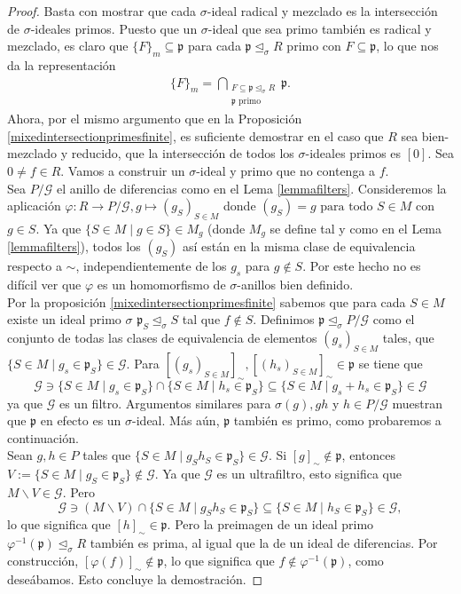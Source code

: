 \documentclass[letterpaper]{article}
\def\fa{\text{ para todo }}
\def\p{\mathfrak{p}}
\def\s{\sigma}
\def\si{\unlhd_{\sigma}}
\theoremstyle{definition}
\begin{document}
\begin{proof}
Basta con mostrar que cada $\sigma$-ideal radical y mezclado es la intersecci\'on de $\sigma$-ideales primos. Puesto que un $\sigma$-ideal que sea primo tambi\'en es radical y mezclado,
es claro que $\{F\}_m \subseteq \p$ para cada $\p \si R$ primo con $F \subseteq \p$, lo que nos da la representaci\'on
\begin{align*} \{F\}_m = \bigcap_{\substack{F \subseteq \p \si R \\ \p \text{ primo}}} \p. \end{align*}
Ahora, por el mismo argumento que en la Proposici\'on \ref{mixedintersectionprimesfinite}, es suficiente demostrar en el caso que $R$ sea bien-mezclado y reducido, que la intersecci\'on de todos los $\sigma$-ideales primos es $[0]$.
Sea $0 \neq f \in R$. Vamos a construir un $\sigma$-ideal y primo que no contenga a $f$.\\

Sea $P/\mathcal{G}$ el anillo de diferencias como en el Lema \ref{lemmafilters}. Consideremos la aplicaci\'on $\varphi: R \rightarrow P/\mathcal{G}, g \mapsto (g_S)_{S \in M}$ donde $(g_S) = g \fa S \in M$ con $g \in S$. 
Ya que $\{ S \in M \mid g \in S \} \in M_g$ (donde $M_g$ se define tal y como en el Lema \ref{lemmafilters}), todos los $(g_S)$ as\'i est\'an en la misma clase de equivalencia respecto a $\sim$, independientemente de los $g_s$ para $g \notin S$. 
Por este hecho no es dif\'icil ver que $\varphi$ es un homomorfismo de $\sigma$-anillos bien definido. \\

Por la proposici\'on \ref{mixedintersectionprimesfinite} sabemos que para cada $S \in M$ existe un ideal primo $\s$ $\p_S \si S$ tal que $f \notin S$. 
Definimos $\p \si P/\mathcal{G}$ como el conjunto de todas las clases de equivalencia de elementos $(g_s)_{S \in M}$ tales, que $\{ S \in M \mid g_s \in \p_S \} \in \mathcal{G}$. 
Para $[(g_s)_{S \in M}]_{\sim}, [(h_s)_{S \in M}]_{\sim} \in \p$ se tiene que $$ \mathcal{G} \ni \{ S \in M \mid  g_s \in \p_S \} \cap  \{ S \in M \mid  h_s \in \p_S \} \subseteq \{ S \in M \mid  g_s + h_s \in \p_S \} \in \mathcal{G}$$
ya que $\mathcal{G}$ es un filtro. Argumentos similares para $\s(g), gh$ y $h \in P/\mathcal{G}$ muestran que $\p$ en efecto es un $\sigma$-ideal. M\'as a\'un, $\p$ tambi\'en es primo, como probaremos a continuaci\'on.\\

Sean $g,h \in P$ tales que $\{ S \in M \mid g_Sh_S \in \p_S \} \in \mathcal{G}$. Si $[g]_\sim \notin \p$, entonces $V:= \{ S \in M \mid g_S \in \p_S \} \notin \mathcal{G}$. Ya que $\mathcal{G}$ es un ultrafiltro, 
esto significa que $M \backslash V \in \mathcal{G}$. Pero $$\mathcal{G} \ni (M \backslash V) \cap \{ S \in M \mid g_S h_S \in \p_S \} \subseteq \{ S \in M \mid h_S \in \p_S \} \in \mathcal{G},$$ lo que significa que $[h]_\sim \in \p$.
Pero la preimagen de un ideal primo $\varphi^{-1}(\p) \si R$ tambi\'en es prima, al igual que la de un ideal de diferencias. Por construcci\'on, $[\varphi(f)]_\sim \notin \p$, lo que significa que $f \notin \varphi^{-1}(\p)$, como dese\'abamos. Esto concluye la demostraci\'on.
\end{proof}
\end{document}
